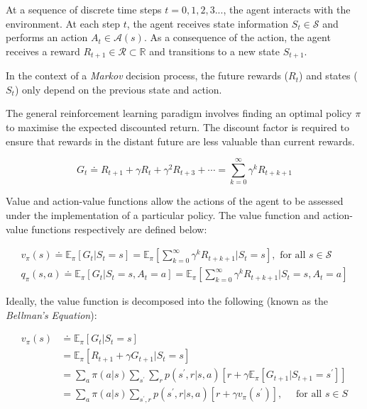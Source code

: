 \documentclass[12pt, authoryear]{elsarticle}
\begin{document}
At a sequence of discrete time steps $t = 0,1,2,3...$, the agent interacts with the environment. At each step $t$, the agent receives state information $S _ { t } \in \mathcal{S}$ and performs an action $A _ { t } \in \mathcal { A } ( s )$. As a consequence of the action, the agent receives a reward $R _ { t + 1 } \in \mathcal { R } \subset \mathbb { R }$ and transitions to a new state $S _ { t + 1 }$.

In the context of a \textit{Markov} decision process, the future rewards ($R_{t}$) and states ($S_{t}$) only depend on the previous state and action. 

The general reinforcement learning paradigm involves finding an optimal policy $\pi$ to maximise the expected discounted return. The discount factor is required to ensure that rewards in the distant future are less valuable than current rewards.

$$
G _ { t } \doteq R _ { t + 1 } + \gamma R _ { t  } + \gamma ^ { 2 } R _ { t + 3 } + \cdots = \sum _ { k = 0 } ^ { \infty } \gamma ^ { k } R _ { t + k + 1 }
$$

Value and action-value functions allow the actions of the agent to be assessed under the implementation of a particular policy. The value function and action-value functions respectively are defined below:

$$
\begin{aligned}
v _ { \pi } ( s ) \doteq \mathbb { E } _ { \pi } \left[ G _ { t } | S _ { t } = s \right] = \mathbb { E } _ { \pi } \left[ \sum _ { k = 0 } ^ { \infty } \gamma ^ { k } R _ { t + k + 1 } | S _ { t } = s \right] , \text { for all } s \in \mathcal{S} \\
q _ { \pi } ( s , a ) \doteq \mathbb { E } _ { \pi } \left[ G _ { t } | S _ { t } = s , A _ { t } = a \right] = \mathbb { E } _ { \pi } \left[ \sum _ { k = 0 } ^ { \infty } \gamma ^ { k } R _ { t + k + 1 } | S _ { t } = s , A _ { t } = a \right]
\end{aligned}
$$ 

Ideally, the value function is decomposed into the following (known as the \textit{Bellman's Equation}):

$$
\begin{aligned} v _ { \pi } ( s ) & \doteq \mathbb { E } _ { \pi } \left[ G _ { t } | S _ { t } = s \right] \\ & = \mathbb { E } _ { \pi } \left[ R _ { t + 1 } + \gamma G _ { t + 1 } | S _ { t } = s \right] \\ & = \sum _ { a } \pi ( a | s ) \sum _ { s ^ { \prime } } \sum _ { r } p \left( s ^ { \prime } , r | s , a \right) \left[ r + \gamma \mathbb { E } _ { \pi } \left[ G _ { t + 1 } | S _ { t + 1 } = s ^ { \prime } \right] \right] \\ & = \sum _ { a } \pi ( a | s ) \sum _ { s ^ { \prime } , r } p \left( s ^ { \prime } , r | s , a \right) \left[ r + \gamma v _ { \pi } \left( s ^ { \prime } \right) \right] , \quad \text { for all } s \in S \end{aligned}
$$
\end{document}
